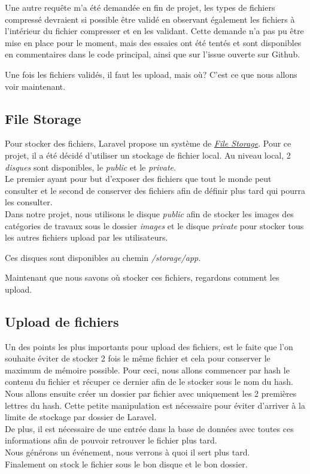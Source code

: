 \documentclass[
    iai, %
    il, %
]{heig-tb}
\begin{document}
Une autre requête m'a été demandée en fin de projet, les types de fichiers compressé devraient si possible être validé en observant également les fichiers à l'intérieur du fichier compresser et en les validant. Cette demande n'a pas pu être mise en place pour le moment, mais des essaies ont été tentés et sont disponibles en commentaires dans le code principal, ainsi que sur l'issue ouverte sur Github.

Une fois les fichiers validés, il faut les upload, mais où? C'est ce que nous allons voir maintenant.

\subsection{File Storage}
Pour stocker des fichiers, Laravel propose un système de \href{https://laravel.com/docs/9.x/filesystem}{\emph{File Storage}}. Pour ce projet, il a été décidé d'utiliser un stockage de fichier local. Au niveau local, 2 \emph{disques} sont disponibles, le \emph{public} et le \emph{private}. \\
Le premier ayant pour but d'exposer des fichiers que tout le monde peut consulter et le second de conserver des fichiers afin de définir plus tard qui pourra les consulter. \\

Dans notre projet, nous utilisons le disque \emph{public} afin de stocker les images des catégories de travaux sous le dossier \emph{images} et le disque \emph{private} pour stocker tous les autres fichiers upload par les utilisateurs.

Ces disques sont disponibles au chemin \emph{/storage/app}.

Maintenant que nous savons où stocker ces fichiers, regardons comment les upload.

\subsection{Upload de fichiers}
Un des points les plus importants pour upload des fichiers, est le faite que l'on souhaite éviter de stocker 2 fois le même fichier et cela pour conserver le maximum de mémoire possible. Pour ceci, nous allons commencer par \Gls{hash} le contenu du fichier et récuper ce dernier afin de le stocker sous le nom du \Gls{hash}. \\
Nous allons ensuite créer un dossier par fichier avec uniquement les 2 premières lettres du hash. Cette petite manipulation est nécessaire pour éviter d'arriver à la limite de stockage par dossier de Laravel. \\
De plus, il est nécessaire de une entrée dans la base de données avec toutes ces informations afin de pouvoir retrouver le fichier plus tard. \\
Nous générons un événement, nous verrons à quoi il sert plus tard. \\
Finalement on stock le fichier sous le bon disque et le bon dossier.
\end{document}
